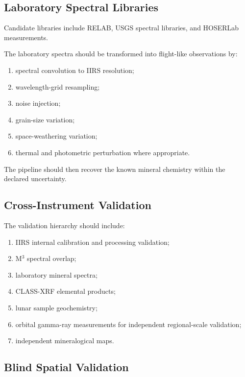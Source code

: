 \documentclass[11pt,a4paper]{article}
\begin{document}
\subsection{Laboratory Spectral Libraries}

Candidate libraries include RELAB, USGS spectral libraries, and HOSERLab measurements.

The laboratory spectra should be transformed into flight-like observations by:

\begin{enumerate}
    \item spectral convolution to IIRS resolution;
    \item wavelength-grid resampling;
    \item noise injection;
    \item grain-size variation;
    \item space-weathering variation;
    \item thermal and photometric perturbation where appropriate.
\end{enumerate}

The pipeline should then recover the known mineral chemistry within the declared uncertainty.

\subsection{Cross-Instrument Validation}

The validation hierarchy should include:

\begin{enumerate}
    \item IIRS internal calibration and processing validation;
    \item M$^3$ spectral overlap;
    \item laboratory mineral spectra;
    \item CLASS-XRF elemental products;
    \item lunar sample geochemistry;
    \item orbital gamma-ray measurements for independent regional-scale validation;
    \item independent mineralogical maps.
\end{enumerate}

\subsection{Blind Spatial Validation}
\end{document}
